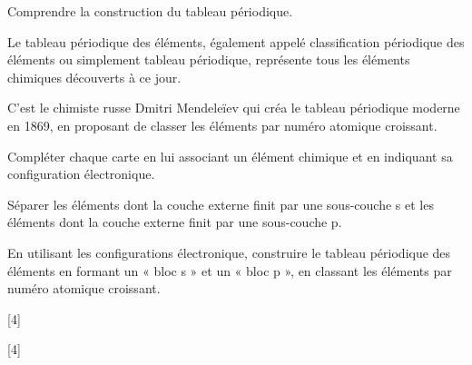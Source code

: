 \teteSndAtom


\begin{objectifs}
  \item Comprendre la construction du tableau périodique.
\end{objectifs}

\begin{contexte}
  Le tableau périodique des éléments, également appelé classification périodique des éléments ou simplement tableau périodique, représente tous les éléments chimiques découverts à ce jour.
  
 C'est le chimiste russe Dmitri Mendeleïev qui créa le tableau périodique moderne en 1869, en proposant de classer les éléments par numéro atomique croissant.

\end{contexte}


\mesure
Compléter chaque carte en lui associant un élément chimique et en indiquant sa configuration électronique.

\mesure
Séparer les éléments dont la couche externe finit par une sous-couche s et les éléments dont la couche externe finit par une sous-couche p.

\mesure
En utilisant les configurations électronique, construire le tableau périodique des éléments en formant un « bloc s » et un « bloc p », en classant les éléments par numéro atomique croissant.


[4]

[4]

